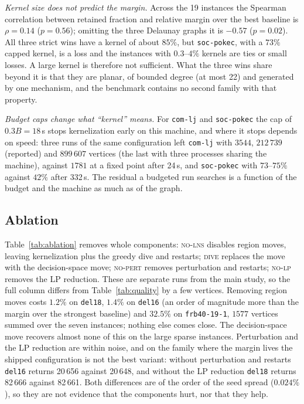 \documentclass[review,authoryear,11pt]{elsarticle}
\theoremstyle{definition}
\begin{document}
\emph{Kernel size does not predict the margin.} Across the 19 instances the Spearman
correlation between retained fraction and relative margin over the best baseline is
$\rho=0.14$ ($p=0.56$); omitting the three Delaunay graphs it is $-0.57$ ($p=0.02$).
All three strict wins have a kernel of about $85\%$, but \texttt{soc-pokec}, with a
$73\%$ capped kernel, is a loss and the instances with $0.3$--$4\%$ kernels are ties or
small losses. A large kernel is therefore not sufficient. What the three wins share
beyond it is that they are planar, of bounded degree (at most 22) and generated by one
mechanism, and the benchmark contains no second family with that property.

\emph{Budget caps change what ``kernel'' means.} For \texttt{com-lj} and
\texttt{soc-pokec} the cap of $0.3B=18$\,s stops kernelization early on this machine,
and where it stops depends on speed: three runs of the same configuration left
\texttt{com-lj} with $3544$, $212\,739$ (reported) and $899\,607$ vertices (the last with
three processes sharing the machine), against $1781$ at a fixed point after 24\,s, and
\texttt{soc-pokec} with $73$--$75\%$ against $42\%$ after 332\,s. The residual a budgeted
run searches is a function of the budget and the machine as much as of the graph.

\subsection{Ablation}
\label{sec:ablation}

Table~\ref{tab:ablation} removes whole components: \textsc{no-lns} disables region
moves, leaving kernelization plus the greedy dive and restarts; \textsc{dive} replaces
the move with the decision-space move; \textsc{no-pert} removes perturbation and
restarts; \textsc{no-lp} removes the LP reduction. These are separate runs from the main
study, so the full column differs from Table~\ref{tab:quality} by a few vertices.
Removing region moves costs $1.2\%$ on \texttt{del18}, $1.4\%$ on \texttt{del16} (an order
of magnitude more than the margin over the strongest baseline) and $32.5\%$ on
\texttt{frb40-19-1}, $1577$ vertices summed over the seven instances; nothing else comes
close. The decision-space move recovers almost none of this on the large sparse
instances. Perturbation and the LP reduction are within noise, and on the family where
the margin lives the shipped configuration is not the best variant: without
perturbation and restarts \texttt{del16} returns 20\,656 against 20\,648, and without
the LP reduction \texttt{del18} returns 82\,666 against 82\,661. Both differences are of
the order of the seed spread ($0.024\%$), so they are not evidence that the components
hurt, nor that they help.
\end{document}
